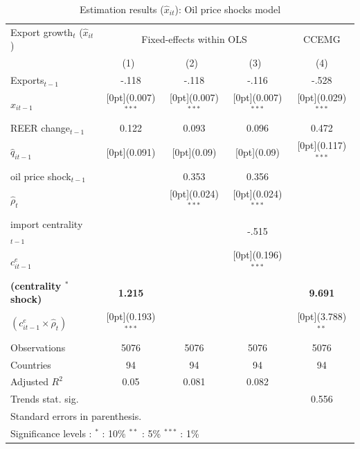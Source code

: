 \documentclass[10pt,letterpaper,pdftex]{article}
\begin{document}
\begin{table}[!htb]\centering
\caption{Estimation results ($\hat{x}_{it}$): Oil price shocks model
\label{tab:OilShocksModel}}
\begin{tabular*}{0.8\textwidth}{@{\extracolsep{\fill}}lcccc}				
Export growth$_t$ ($\hat{x}_{it}$)	& \multicolumn{3}{c}{Fixed-effects within OLS} &	\multicolumn{1}{c}{CCEMG} \\
\cline{2-5}				
	& \multicolumn{1}{c}{(1)\mbox{\ }} &	\multicolumn{1}{c}{(2)\mbox{\ }} &	\multicolumn{1}{c}{(3)\mbox{\ }} &	\multicolumn{1}{c}{(4)} \\
\hline				
Exports$_{t-1}$ &	-.118 &	-.118 &	-.116 &	-.528 \\
\quad $x_{it-1}$ &	\raisebox{.7ex}[0pt]{\scriptsize (0.007)$^{***}$} &	\raisebox{.7ex}[0pt]{\scriptsize (0.007)$^{***}$} &	\raisebox{.7ex}[0pt]{\scriptsize (0.007)$^{***}$} &	\raisebox{.7ex}[0pt]{\scriptsize (0.029)$^{***}$} \\
REER change$_{t-1}$ &	0.122 &	0.093 &	0.096 &	0.472 \\
\quad $\hat{q}_{it-1}$ &	\raisebox{.7ex}[0pt]{\scriptsize (0.091)} &	\raisebox{.7ex}[0pt]{\scriptsize (0.09)} &	\raisebox{.7ex}[0pt]{\scriptsize (0.09)} &	\raisebox{.7ex}[0pt]{\scriptsize (0.117)$^{***}$} \\
oil price shock$_{t-1}$ &	&	0.353 &	0.356 &	\\
\quad $\hat{\rho}_{t}$ &	&	\raisebox{.7ex}[0pt]{\scriptsize (0.024)$^{***}$} &	\raisebox{.7ex}[0pt]{\scriptsize (0.024)$^{***}$} &	\\
import centrality$_{t-1}$ &	&	&	-.515 &	\\
\quad $c^e_{it-1}$&	&	&	\raisebox{.7ex}[0pt]{\scriptsize (0.196)$^{***}$} &	\\
\textbf{(centrality $^*$ shock)} &	\textbf{1.215} &	&	&	\textbf{9.691} \\
\quad $(c^e_{it-1} \times \hat{\rho}_{t})$&	\raisebox{.7ex}[0pt]{\scriptsize (0.193)$^{***}$} &	&	&	\raisebox{.7ex}[0pt]{\scriptsize (3.788)$^{**}$} \\
\hline
Observations &	5076 &	5076 &	5076 &	5076 \\
Countries &	94 &	94 &	94 &	94 \\
Adjusted $R^2$ &	0.05 &	0.081 &	0.082 &	\\
Trends stat. sig. &	&	&	&	0.556 \\
\hline\hline	
\multicolumn{5}{l}{\footnotesize{Standard errors in parenthesis.}}\\
\multicolumn{5}{l}{\footnotesize{Significance levels
:\hspace{1em} $^{*}$ : 10\% \hspace{1em}
$^{**}$ : 5\% \hspace{1em} $^{***}$ : 1\% \normalsize}}					
\end{tabular*}%
\end{table}
\end{document}
